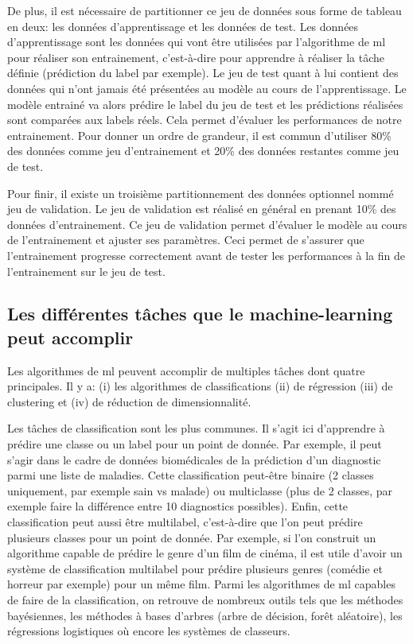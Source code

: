 De plus, il est nécessaire de partitionner ce jeu de données sous forme de tableau en deux: les données d'apprentissage et les données de test. Les données d'apprentissage sont les données qui vont être utilisées par l'algorithme de \gls{ml} pour réaliser son entrainement, c'est-à-dire pour apprendre à réaliser la tâche définie (prédiction du label par exemple). Le jeu de test quant à lui contient des données qui n'ont jamais été présentées au modèle au cours de l'apprentissage. Le modèle entrainé va alors prédire le label du jeu de test et les prédictions réalisées sont comparées aux labels réels. Cela permet d'évaluer les performances de notre entrainement. Pour donner un ordre de grandeur, il est commun d'utiliser 80\% des données comme jeu d'entrainement et 20\% des données restantes comme jeu de test.

Pour finir, il existe un troisième partitionnement des données optionnel nommé jeu de validation. Le jeu de validation est réalisé en général en prenant 10\% des données d'entrainement. Ce jeu de validation permet d'évaluer le modèle au cours de l'entrainement et  ajuster ses paramètres. Ceci permet de s'assurer que l'entrainement progresse correctement avant de tester les performances à la fin de l'entrainement sur le jeu de test.

\subsection{Les différentes tâches que le machine-learning peut accomplir}
Les algorithmes de \gls{ml} peuvent accomplir de multiples tâches dont quatre principales. Il y a: (i) les algorithmes de classifications (ii) de régression (iii) de clustering et (iv) de réduction de dimensionnalité.

Les tâches de classification sont les plus communes. Il s'agit ici d'apprendre à prédire une classe ou un label pour un point de donnée. Par exemple, il peut s'agir dans le cadre de données biomédicales de la prédiction d'un diagnostic parmi une liste de maladies. Cette classification peut-être binaire (2 classes uniquement, par exemple sain vs malade) ou multiclasse (plus de 2 classes, par exemple faire la différence entre 10 diagnostics possibles). Enfin, cette classification peut aussi être multilabel, c'est-à-dire que l'on peut prédire plusieurs classes pour un point de donnée. Par exemple, si l’on construit un algorithme capable de prédire le genre d'un film de cinéma, il est utile d'avoir un système de classification multilabel pour prédire plusieurs genres (comédie et horreur par exemple) pour un même film. Parmi les algorithmes de \gls{ml} capables de faire de la classification, on retrouve de nombreux outils tels que les méthodes bayésiennes, les méthodes à bases d'arbres (arbre de décision, forêt aléatoire), les régressions logistiques où encore les systèmes de classeurs.

